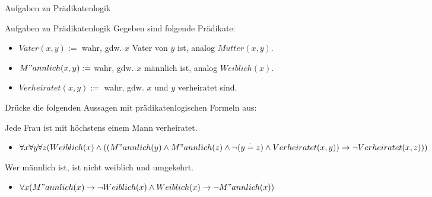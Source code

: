 \begin{frame}{Aufgaben zu Prädikatenlogik}
	\begin{taskblock}{Aufgaben zu Prädikatenlogik}
		Gegeben sind folgende Prädikate:
		\begin{itemize}
			\item $Vater(x,y) := $ wahr, gdw. $x$ Vater von $y$ ist, analog $Mutter(x,y)$.
			\item $M"annlich(x,y) := $ wahr, gdw. $x$ männlich ist, analog $Weiblich(x)$.
			\item $Verheiratet(x,y) := $ wahr, gdw. $x$ und $y$ verheiratet sind.
		\end{itemize}
		
		
		Drücke die folgenden Aussagen mit prädikatenlogischen Formeln aus:
		
		\begin{itemize}
			\pitem Jede Frau ist mit höchstens einem Mann verheiratet.
			\begin{itemize}
				\pause\item $\forall x \forall y \forall z (Weiblich(x) \land((M"annlich(y) \land M"annlich(z) \land \lnot (y \stackrel{\cdot}{=} z) \land Verheiratet(x,y)) \rightarrow \lnot Verheiratet(x,z)))$
			\end{itemize}
			\pitem Wer männlich ist, ist nicht weiblich und umgekehrt.
			\begin{itemize}
				\pause\item $\forall x (M"annlich(x) \rightarrow \lnot Weiblich(x) \land Weiblich(x) \rightarrow \lnot M"annlich(x))$
			\end{itemize}
		\end{itemize}
	\end{taskblock}
\end{frame}


